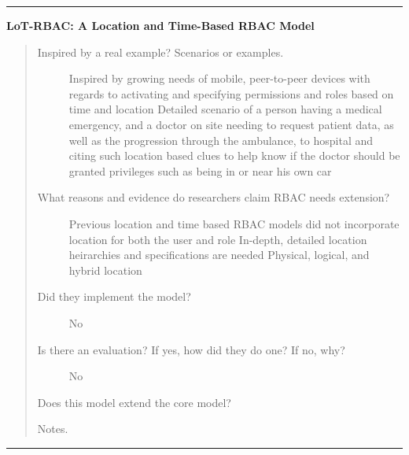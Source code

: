 \documentclass[letterpaper,10pt,english]{sphinxmanual}
\begin{document}
\bigskip\hrule{}\bigskip


\textbf{LoT-RBAC: A Location and Time-Based RBAC Model}
\begin{quote}
\begin{description}
\item[{Inspired by a real example? Scenarios or examples.}] \leavevmode
Inspired by growing needs of mobile, peer-to-peer devices with regards to activating and specifying permissions and roles based on time and location
Detailed scenario of a person having a medical emergency, and a doctor on site needing to request patient data, as well as the progression through the ambulance, to hospital and citing such location based clues to help know if the doctor should be granted privileges such as being in or near his own car

\item[{What reasons and evidence do researchers claim RBAC needs extension?}] \leavevmode
Previous location and time based RBAC models did not incorporate location for both the user and role
In-depth, detailed location heirarchies and specifications are needed
Physical, logical, and hybrid location

\item[{Did they implement the model?}] \leavevmode
No

\item[{Is there an evaluation? If yes, how did they do one? If no, why?}] \leavevmode
No

\end{description}

Does this model extend the core model?

Notes.
\end{quote}


\bigskip\hrule{}\bigskip
\end{document}
